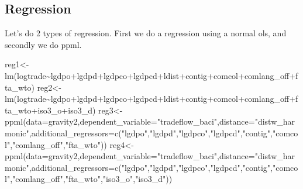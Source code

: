 \documentclass[
  a4paper,
  DIV=11,
  numbers=noendperiod]{scrreprt}
\newenvironment{Shaded}{\begin{snugshade}}{\end{snugshade}}
\newcommand{\AttributeTok}[1]{\textcolor[rgb]{0.40,0.45,0.13}{#1}}
\newcommand{\FunctionTok}[1]{\textcolor[rgb]{0.28,0.35,0.67}{#1}}
\newcommand{\NormalTok}[1]{\textcolor[rgb]{0.00,0.23,0.31}{#1}}
\newcommand{\OtherTok}[1]{\textcolor[rgb]{0.00,0.23,0.31}{#1}}
\newcommand{\SpecialCharTok}[1]{\textcolor[rgb]{0.37,0.37,0.37}{#1}}
\newcommand{\StringTok}[1]{\textcolor[rgb]{0.13,0.47,0.30}{#1}}
\begin{document}
\hypertarget{regression}{%
\subsection{Regression}\label{regression}}

Let's do 2 types of regression. First we do a regression using a normal
ols, and secondly we do ppml.

\begin{Shaded}
\begin{Highlighting}[]
\NormalTok{reg1}\OtherTok{\textless{}{-}}\FunctionTok{lm}\NormalTok{(logtrade}\SpecialCharTok{\textasciitilde{}}\NormalTok{lgdpo}\SpecialCharTok{+}\NormalTok{lgdpd}\SpecialCharTok{+}\NormalTok{lgdpco}\SpecialCharTok{+}\NormalTok{lgdpcd}\SpecialCharTok{+}\NormalTok{ldist}\SpecialCharTok{+}\NormalTok{contig}\SpecialCharTok{+}\NormalTok{comcol}\SpecialCharTok{+}\NormalTok{comlang\_off}\SpecialCharTok{+}\NormalTok{fta\_wto)}
\NormalTok{reg2}\OtherTok{\textless{}{-}}\FunctionTok{lm}\NormalTok{(logtrade}\SpecialCharTok{\textasciitilde{}}\NormalTok{lgdpo}\SpecialCharTok{+}\NormalTok{lgdpd}\SpecialCharTok{+}\NormalTok{lgdpco}\SpecialCharTok{+}\NormalTok{lgdpcd}\SpecialCharTok{+}\NormalTok{ldist}\SpecialCharTok{+}\NormalTok{contig}\SpecialCharTok{+}\NormalTok{comcol}\SpecialCharTok{+}\NormalTok{comlang\_off}\SpecialCharTok{+}\NormalTok{fta\_wto}\SpecialCharTok{+}\NormalTok{iso3\_o}\SpecialCharTok{+}\NormalTok{iso3\_d)}
\NormalTok{reg3}\OtherTok{\textless{}{-}}\FunctionTok{ppml}\NormalTok{(}\AttributeTok{data=}\NormalTok{gravity2,}\AttributeTok{dependent\_variable=}\StringTok{"tradeflow\_baci"}\NormalTok{,}\AttributeTok{distance=}\StringTok{"distw\_harmonic"}\NormalTok{,}\AttributeTok{additional\_regressors=}\FunctionTok{c}\NormalTok{(}\StringTok{"lgdpo"}\NormalTok{,}\StringTok{"lgdpd"}\NormalTok{,}\StringTok{"lgdpco"}\NormalTok{,}\StringTok{"lgdpcd"}\NormalTok{,}\StringTok{"contig"}\NormalTok{,}\StringTok{"comcol"}\NormalTok{,}\StringTok{"comlang\_off"}\NormalTok{,}\StringTok{"fta\_wto"}\NormalTok{))}
\NormalTok{reg4}\OtherTok{\textless{}{-}}\FunctionTok{ppml}\NormalTok{(}\AttributeTok{data=}\NormalTok{gravity2,}\AttributeTok{dependent\_variable=}\StringTok{"tradeflow\_baci"}\NormalTok{,}\AttributeTok{distance=}\StringTok{"distw\_harmonic"}\NormalTok{,}\AttributeTok{additional\_regressors=}\FunctionTok{c}\NormalTok{(}\StringTok{"lgdpo"}\NormalTok{,}\StringTok{"lgdpd"}\NormalTok{,}\StringTok{"lgdpco"}\NormalTok{,}\StringTok{"lgdpcd"}\NormalTok{,}\StringTok{"contig"}\NormalTok{,}\StringTok{"comcol"}\NormalTok{,}\StringTok{"comlang\_off"}\NormalTok{,}\StringTok{"fta\_wto"}\NormalTok{,}\StringTok{"iso3\_o"}\NormalTok{,}\StringTok{"iso3\_d"}\NormalTok{))}
\end{Highlighting}
\end{Shaded}
\end{document}
